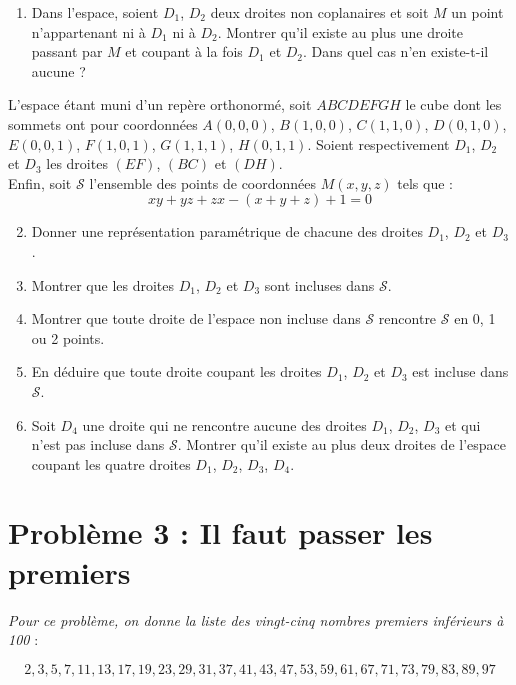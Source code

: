 \documentclass[landscape,twocolumn,leqno,a4paper,10pt]{report} %
\newcommand\n{\noindent}
\begin{document}
\begin{enumerate}
	\item Dans l'espace, soient $D_{1}$, $D_{2}$ deux droites non coplanaires et soit $M$ un point n'appartenant ni à $D_{1}$ ni à $D_{2}$. Montrer qu'il existe au plus une droite passant par $M$ et coupant à la fois $D_{1}$ et $D_{2}$. Dans quel cas n'en existe-t-il aucune ?
\end{enumerate}

\n L'espace étant muni d'un repère orthonormé, soit $A B C D E F G H$ le cube dont les sommets ont pour coordonnées $A(0,0,0)$, $B(1,0,0)$, $C(1,1,0)$, $D(0,1,0)$, $E(0,0,1)$, $F(1,0,1)$, $G(1,1,1)$, $H(0,1,1)$. Soient respectivement $D_{1}$, $D_{2}$ et $D_{3}$ les droites $(E F)$, $(B C)$ et $(D H)$.\\
Enfin, soit $\mathscr{S}$ l'ensemble des points de coordonnées $M(x, y, z)$ tels que :
$$x y+y z+z x-(x+y+z)+1=0$$

\begin{enumerate}\setcounter{enumi}{1}
	\item Donner une représentation paramétrique de chacune des droites $D_{1}$, $D_{2}$ et $D_{3}$.
	\item Montrer que les droites $D_{1}$, $D_{2}$ et $D_{3}$ sont incluses dans $\mathscr{S}$.
	\item Montrer que toute droite de l'espace non incluse dans $\mathscr{S}$ rencontre $\mathscr{S}$ en 0, 1 ou 2 points.
	\item En déduire que toute droite coupant les droites $D_{1}$, $D_{2}$ et $D_{3}$ est incluse dans $\mathscr{S}$.
	\item Soit $D_{4}$ une droite qui ne rencontre aucune des droites $D_{1}$, $D_{2}$, $D_{3}$ et qui n'est pas incluse dans $\mathscr{S}$. Montrer qu'il existe au plus deux droites de l'espace coupant les quatre droites $D_{1}$, $D_{2}$, $D_{3}$, $D_{4}$.
\end{enumerate}


\section{Problème 3 : Il faut passer les premiers}


\n \textit{Pour ce problème, on donne la liste des vingt-cinq nombres premiers inférieurs à 100} :

$$2,3,5,7,11,13,17,19,23,29,31,37,41,43,47,53,59,61,67,71,73,79,83,89,97$$
\end{document}

